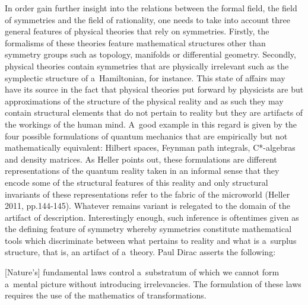 In order gain further insight into the relations between the formal field, the field of symmetries and the field of rationality, one needs to take into account three general features of physical theories that rely on symmetries. Firstly, the formalisms of these theories feature mathematical structures other than symmetry groups such as topology, manifolds or differential geometry. Secondly, physical theories contain symmetries that are physically irrelevant such as the symplectic structure of a~Hamiltonian, for instance. This state of affairs may have its source in the fact that physical theories put forward by physicists are but approximations of the structure of the physical reality and as such they may contain structural elements that do not pertain to reality but they are artifacts of the workings of the human mind. A~good example in this regard is given by the four possible formulations of quantum mechanics that are empirically but not mathematically equivalent: Hilbert spaces, Feynman path integrals, C*-algebras and density matrices. As Heller points out, these formulations are different representations of the quantum reality taken in an informal sense that they encode some of the structural features of this reality and only structural invariants of these representations refer to the fabric of the microworld (Heller 2011, pp.144-145). Whatever remains variant is relegated to the domain of the artifact of description. Interestingly enough, such inference is oftentimes given as the defining feature of symmetry whereby symmetries constitute mathematical tools which discriminate between what pertains to reality and what is a~surplus structure, that is, an artifact of a~theory. Paul Dirac 
\parencite*[][p.vii]{dirac_principles_1930} %
 asserts the following:



[Nature's] fundamental laws control a~substratum of which we cannot form a~mental picture without introducing irrelevancies. The formulation of these laws requires the use of the mathematics of transformations.



